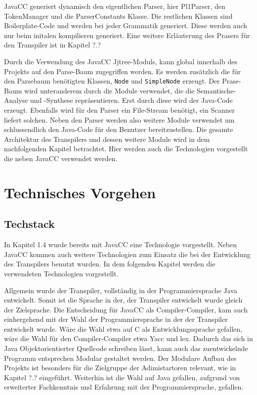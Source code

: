JavaCC generiert dynamisch den eigentlichen Parser, hier Pl1Parser, den TokenManager und die ParserConstants Klasse. Die restlichen Klassen sind Boilerplate-Code und werden bei jeder Grammatik generiert. Diese werden auch nur beim initalen kompilieren generiert. Eine weitere Erläuterung des Prasers für den Transpiler ist in Kapitel ?.?

Durch die Verwendung des JavaCC Jjtree-Moduls, kann global innerhalb des Projekts auf den Parse-Baum zugegriffen werden. 
Es werden zusätzlich die für den Parsebaum benötigten Klassen, \verb+Node+ und \verb+SimpleNode+ erzeugt.
Der Prase-Baum wird unteranderem durch die Module verwendet, die die Semantische-Analyse und -Synthese repräsentieren.
Erst durch diese wird der Java-Code erzeugt.
Ebenfalls wird für den Parser ein File-Stream benötigt, ein Scanner liefert solchen.
Neben den Parser werden also weitere Module verwendet um schlussendlich den Java-Code für den Benutzer bereitzustellen.
Die gesamte Architektur des Transpilers und dessen weitere Module wird in dem nachfolgenden Kapitel betrachtet. 
Hier werden auch die Technologien vorgestellt die neben JavaCC verwendet werden. 

\section{Technisches Vorgehen}
\subsection{Techstack}
In Kapitel 1.4 wurde bereits mit JavaCC eine Technologie vorgestellt. Neben JavaCC kommen auch weitere Technologien zum Einsatz die bei der Entwicklung des Transpilers benutzt wurden. In dem folgenden Kapitel werden die verwendeten Technologien vorgestellt.

Allgemein wurde der Transpiler, vollständig in der Programmiersprache Java entwickelt. Somit ist die Sprache in der, der Transpiler entwickelt wurde gleich der Zielsprache. Die Entscheidung für JavaCC als Compiler-Compiler, kam auch einhergehend mit der Wahl der Programmiersprache in der der Transpiler entwickelt wurde. Wäre die Wahl etwa auf C als Entwicklungssprache gefallen, wäre die Wahl für den Compiler-Compiler etwa Yacc und lex. Dadurch das sich in Java Objektorientierter Quellcode schreiben lässt, kann auch das zuentwickelnde Programm entsprechen Modular gestaltet werden. Der Modulare Aufbau des Projekts ist besonders für die Zielgruppe der Adimistartoren relevant, wie in Kapitel ?.? eingeführt. Weiterhin ist die Wahl auf Java gefallen, aufgrund von erweiterter Fachkenntnis und Erfahrung mit der Programmiersprache, gefallen.

